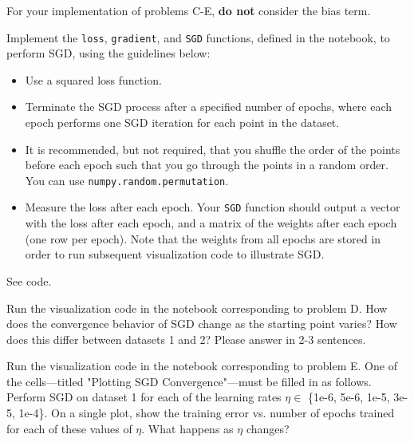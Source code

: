 For your implementation of problems C-E, \textbf{do not} consider the bias term.

\begin{problem}[8]
  Implement the \texttt{loss}, \texttt{gradient}, and \texttt{SGD} functions, defined in the notebook, to perform SGD, using the guidelines below:

  \begin{itemize}
    \item Use a squared loss function.
    \item Terminate the SGD process after a specified number of epochs, where each epoch performs one SGD iteration for each point in the dataset.
    \item It is recommended, but not required, that you shuffle the order of the points before each epoch such that you go through the points in a random order. You can use \texttt{numpy.random.permutation}.
    \item Measure the loss after each epoch. Your \texttt{SGD} function should output a vector with the loss after each epoch, and a matrix of the weights after each epoch (one row per epoch). Note that the weights from all epochs are stored in order to run subsequent visualization code to illustrate SGD.
  \end{itemize}
\end{problem}
\begin{solution}
See code. %
\end{solution}

\begin{problem}[2]
  Run the visualization code in the notebook corresponding to problem D. How does the convergence behavior of SGD change as the starting point varies? How does this differ between datasets 1 and 2? Please answer in 2-3 sentences.
\end{problem}
\begin{solution}

\end{solution}

\begin{problem}[6]
  Run the visualization code in the notebook corresponding to problem E. One of the cells---titled "Plotting SGD Convergence"---must be filled in as follows. Perform SGD on dataset 1 for each of the learning rates $\eta \in$ \{1e-6, 5e-6, 1e-5, 3e-5, 1e-4\}. On a single plot, show the training error vs. number of epochs trained for each of these values of $\eta$. What happens as $\eta$ changes?
\end{problem}

